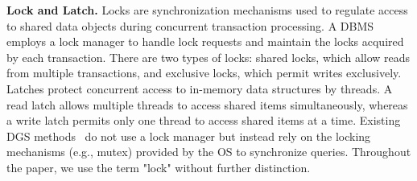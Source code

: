 \vspace{2pt}
\noindent\textbf{Lock and Latch.} Locks are synchronization mechanisms used to regulate access to shared data objects during concurrent transaction processing. A DBMS employs a lock manager to handle lock requests and maintain the locks acquired by each transaction. There are two types of locks: shared locks, which allow reads from multiple transactions, and exclusive locks, which permit writes exclusively. Latches protect concurrent access to in-memory data structures by threads. A read latch allows multiple threads to access shared items simultaneously, whereas a write latch permits only one thread to access shared items at a time. Existing DGS methods~\cite{zhu2019livegraph,macko2015llama,de2021teseo,fuchs2022sortledton,dhulipala2019low} do not use a lock manager but instead rely on the locking mechanisms (e.g., mutex) provided by the OS to synchronize queries. Throughout the paper, we use the term "lock" without further distinction.





